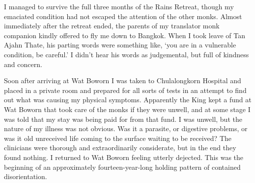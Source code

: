 I managed to survive the full three months of the Rains Retreat, though
my emaciated condition had not escaped the attention of the other monks.
Almost immediately after the retreat ended, the parents of my translator
monk companion kindly offered to fly me down to Bangkok. When I took
leave of Tan Ajahn Thate, his parting words were something like, `you
are in a vulnerable condition, be careful.' I didn't hear his words as
judgemental, but full of kindness and concern.

Soon after arriving at Wat Boworn I was taken to Chulalongkorn Hospital
and placed in a private room and prepared for all sorts of tests in an
attempt to find out what was causing my physical symptoms. Apparently
the King kept a fund at Wat Boworn that took care of the monks if they
were unwell, and at some stage I was told that my stay was being paid
for from that fund. I was unwell, but the nature of my illness was not
obvious. Was it a parasite, or digestive problems, or was it old
unreceived life coming to the surface waiting to be received? The
clinicians were thorough and extraordinarily considerate, but in the end
they found nothing. I returned to Wat Boworn feeling utterly dejected.
This was the beginning of an approximately fourteen-year-long holding
pattern of contained disorientation.

